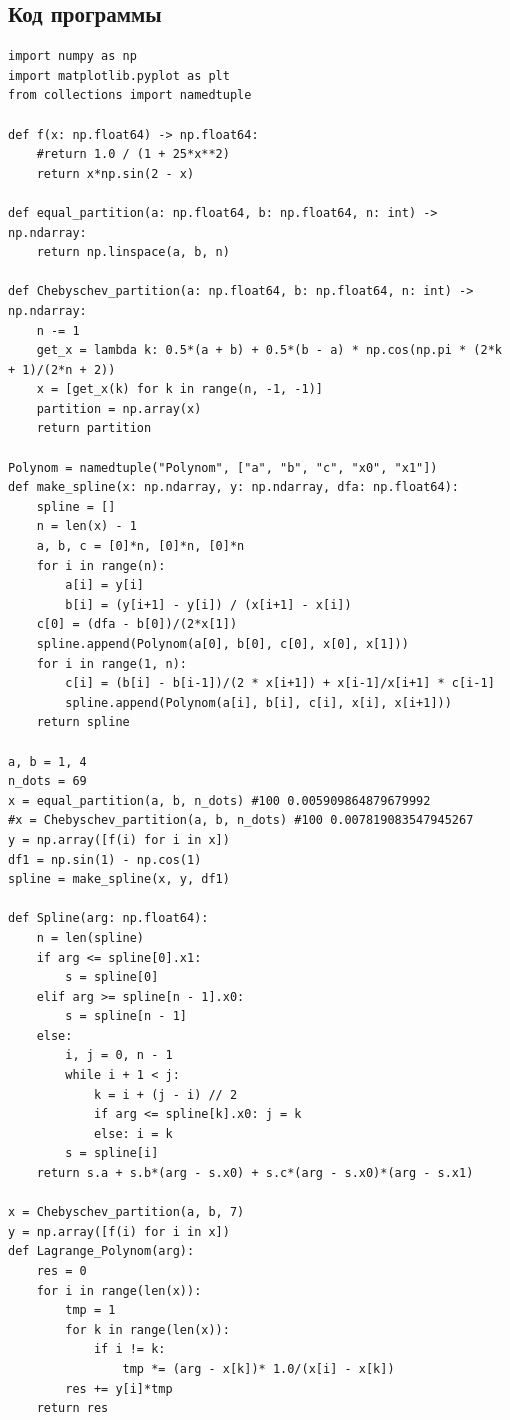\subsection*{Код программы}
\begin{lstlisting}
import numpy as np
import matplotlib.pyplot as plt
from collections import namedtuple

def f(x: np.float64) -> np.float64:
    #return 1.0 / (1 + 25*x**2)
    return x*np.sin(2 - x)

def equal_partition(a: np.float64, b: np.float64, n: int) -> np.ndarray:
    return np.linspace(a, b, n)

def Chebyschev_partition(a: np.float64, b: np.float64, n: int) -> np.ndarray:
    n -= 1
    get_x = lambda k: 0.5*(a + b) + 0.5*(b - a) * np.cos(np.pi * (2*k + 1)/(2*n + 2))
    x = [get_x(k) for k in range(n, -1, -1)]
    partition = np.array(x)
    return partition

Polynom = namedtuple("Polynom", ["a", "b", "c", "x0", "x1"])
def make_spline(x: np.ndarray, y: np.ndarray, dfa: np.float64):
    spline = []
    n = len(x) - 1
    a, b, c = [0]*n, [0]*n, [0]*n
    for i in range(n):
        a[i] = y[i]
        b[i] = (y[i+1] - y[i]) / (x[i+1] - x[i])
    c[0] = (dfa - b[0])/(2*x[1])
    spline.append(Polynom(a[0], b[0], c[0], x[0], x[1]))
    for i in range(1, n):
        c[i] = (b[i] - b[i-1])/(2 * x[i+1]) + x[i-1]/x[i+1] * c[i-1]
        spline.append(Polynom(a[i], b[i], c[i], x[i], x[i+1]))
    return spline

a, b = 1, 4
n_dots = 69
x = equal_partition(a, b, n_dots) #100 0.005909864879679992
#x = Chebyschev_partition(a, b, n_dots) #100 0.007819083547945267
y = np.array([f(i) for i in x])
df1 = np.sin(1) - np.cos(1)
spline = make_spline(x, y, df1)

def Spline(arg: np.float64):
    n = len(spline)    
    if arg <= spline[0].x1:
        s = spline[0]
    elif arg >= spline[n - 1].x0:
        s = spline[n - 1]
    else:
        i, j = 0, n - 1
        while i + 1 < j:
            k = i + (j - i) // 2
            if arg <= spline[k].x0: j = k
            else: i = k
        s = spline[i]
    return s.a + s.b*(arg - s.x0) + s.c*(arg - s.x0)*(arg - s.x1)

x = Chebyschev_partition(a, b, 7)
y = np.array([f(i) for i in x])
def Lagrange_Polynom(arg):
    res = 0
    for i in range(len(x)):
        tmp = 1
        for k in range(len(x)):
            if i != k:
                tmp *= (arg - x[k])* 1.0/(x[i] - x[k])
        res += y[i]*tmp
    return res
\end{lstlisting}
